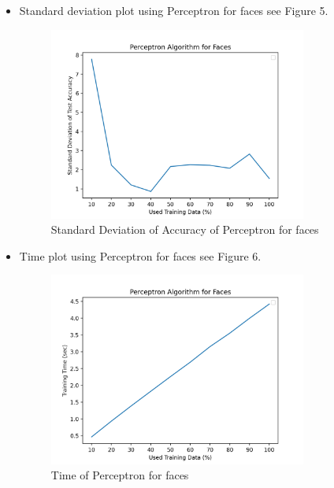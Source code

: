 \documentclass{article}
\begin{document}
\begin{itemize}
    \item Standard deviation plot using Perceptron for faces see Figure 5.
    \begin{figure}
        \centering
        \includegraphics[width=0.8\textwidth]{perFaSd.png}
        \caption{Standard Deviation of Accuracy of Perceptron for faces}
    \end{figure}
    
    \item Time plot using Perceptron for faces see Figure 6.
    \begin{figure}
        \centering
        \includegraphics[width=0.8\textwidth]{perFaTime.png}
        \caption{Time of Perceptron for faces}
    \end{figure}
\end{itemize}
\end{document}
